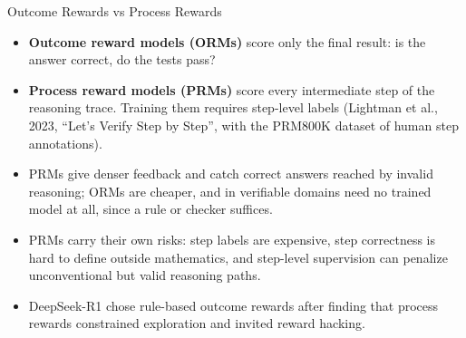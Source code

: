 \begin{frame}{Outcome Rewards vs Process Rewards}
  \begin{itemize}\itemsep0.4em
    \item[\textcolor{red}{$\blacktriangleright$}] \textbf{Outcome reward models (ORMs)} score only the final result: is the answer correct, do the tests pass?
    \item[\textcolor{red}{$\blacktriangleright$}] \textbf{Process reward models (PRMs)} score every intermediate step of the reasoning trace. Training them requires step-level labels (Lightman et al., 2023, ``Let's Verify Step by Step'', with the PRM800K dataset of human step annotations).
    \item[\textcolor{red}{$\blacktriangleright$}] PRMs give denser feedback and catch correct answers reached by invalid reasoning; ORMs are cheaper, and in verifiable domains need no trained model at all, since a rule or checker suffices.
    \item[\textcolor{red}{$\blacktriangleright$}] PRMs carry their own risks: step labels are expensive, step correctness is hard to define outside mathematics, and step-level supervision can penalize unconventional but valid reasoning paths.
    \item[\textcolor{red}{$\blacktriangleright$}] DeepSeek-R1 chose rule-based outcome rewards after finding that process rewards constrained exploration and invited reward hacking.
  \end{itemize}
\end{frame}
